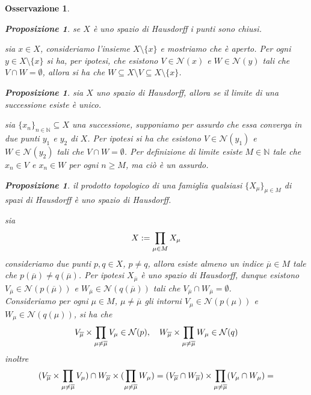 \documentclass[oneside, 11pt]{amsbook}
\makeatletter
\newcommand{\0}{{(0)}}
\newcommand{\3}{{(3)}}
\theoremstyle{colonplain}
\newtheorem{prop}[thm]{Proposizione}
\theoremstyle{colondefinition}
\theoremstyle{colonremark}
\newtheorem{rmk}[thm]{Osservazione}
\numberwithin{equation}{chapter}
\renewcommand{\proofname}{Dimostrazione}
\renewenvironment{proof}[1][\proofname]{\par
  \pushQED{\end{proof}}%
  \normalfont \topsep6\p@\@plus6\p@\relax
  \trivlist
  \item[\hskip\labelsep\bfseries #1:]\ignorespaces
}{%
  \popQED\endtrivlist\@endpefalse
}
\makeatother
\begin{document}
\begin{rmk}
\begin{prop}
se $X$ è uno spazio di Hausdorff i punti sono chiusi.
\end{prop}
\begin{proof} sia $x \in X$, consideriamo l'insieme $X \setminus \{ x \}$ e mostriamo che è aperto. Per ogni $y \in X \setminus \{ x \}$ si ha, per ipotesi, che esistono $V \in \mathcal{N}(x)$ e $W \in \mathcal{N}(y)$ tali che $V \cap W = \emptyset$, allora si ha che $W \subseteq X \setminus V \subseteq X \setminus \{ x \}$.
\end{proof}
\begin{prop}
sia $X$ uno spazio di Hausdorff, allora se il limite di una successione esiste è unico.
\end{prop}
\begin{proof}
sia $\{ x_n \}_{n \in \mathbb{N}} \subseteq X$ una successione, supponiamo per assurdo che essa converga in due punti $y_1$ e $y_2$ di $X$. Per ipotesi si ha che esistono $V \in \mathcal{N}(y_1)$ e $W \in \mathcal{N}(y_2)$ tali che $V \cap W = \emptyset$. Per definizione di limite esiste $M \in \mathbb{N}$ tale che $x_n \in V$ e $x_n \in W$ per ogni $n \geq M$, ma ciò è un assurdo.
\end{proof}
\begin{prop}
il prodotto topologico di una famiglia qualsiasi $\{ X_\mu \}_{\mu \in M}$ di spazi di Hausdorff è uno spazio di Hausdorff.
\end{prop}
\begin{proof}
sia
\begin{align}
    X := \prod_{\mu \in M} X_\mu \notag
\end{align}
consideriamo due punti $p, q \in X$, $p \neq q$, allora esiste almeno un indice $\overline{\mu} \in M$ tale che $p(\overline{\mu}) \neq q(\overline{\mu})$. Per ipotesi $X_{\overline{\mu}}$ è uno spazio di Hausdorff, dunque esistono $V_{\overline{\mu}} \in \mathcal{N}(p(\overline{\mu}))$ e $W_{\overline{\mu}} \in \mathcal{N}(q(\overline{\mu}))$ tali che $V_{\overline{\mu}} \cap W_{\overline{\mu}} = \emptyset$. \\
Consideriamo per ogni $\mu \in M$, $\mu \neq \overline{\mu}$ gli intorni $V_\mu \in \mathcal{N}(p(\mu))$ e $W_\mu \in \mathcal{N}(q(\mu))$, si ha che
\begin{align}
    V_{\overline{\mu}} \times \prod_{\mu \neq \overline{\mu}} V_\mu \in \mathcal{N}(p), \quad W_{\overline{\mu}} \times \prod_{\mu \neq \overline{\mu}} W_\mu \in \mathcal{N}(q) \notag
\end{align}
inoltre
\begin{align}
    (V_{\overline{\mu}} \times \prod_{\mu \neq \overline{\mu}} V_\mu) \cap W_{\overline{\mu}} \times (\prod_{\mu \neq \overline{\mu}} W_\mu) &= (V_{\overline{\mu}} \cap W_{\overline{\mu}}) \times \prod_{\mu \neq \overline{\mu}} (V_\mu \cap W_\mu) = \notag \\

\end{align}
\end{proof}
\end{rmk}
\end{document}
